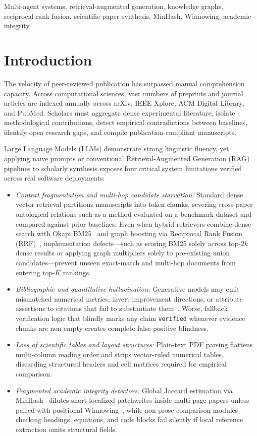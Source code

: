 \documentclass[conference]{IEEEtran}
\begin{document}
\begin{IEEEkeywords}
Multi-agent systems, retrieval-augmented generation, knowledge graphs, reciprocal rank fusion, scientific paper synthesis, MinHash, Winnowing, academic integrity.
\end{IEEEkeywords}

\section{Introduction}
The velocity of peer-reviewed publication has surpassed manual comprehension capacity. Across computational sciences, vast numbers of preprints and journal articles are indexed annually across arXiv, IEEE Xplore, ACM Digital Library, and PubMed. Scholars must aggregate dense experimental literature, isolate methodological contributions, detect empirical contradictions between baselines, identify open research gaps, and compile publication-compliant manuscripts.

Large Language Models (LLMs) demonstrate strong linguistic fluency, yet applying naive prompts or conventional Retrieval-Augmented Generation (RAG)~\cite{lewis2020rag} pipelines to scholarly synthesis exposes four critical system limitations verified across real software deployments:
\begin{itemize}
  \item \emph{Context fragmentation and multi-hop candidate starvation:} Standard dense vector retrieval partitions manuscripts into token chunks, severing cross-paper ontological relations such as a method evaluated on a benchmark dataset and compared against prior baselines. Even when hybrid retrievers combine dense search with Okapi BM25~\cite{robertson2009bm25} and graph boosting via Reciprocal Rank Fusion (RRF)~\cite{cormack2009rrf}, implementation defects---such as scoring BM25 solely across top-$2k$ dense results or applying graph multipliers solely to pre-existing union candidates---prevent unseen exact-match and multi-hop documents from entering top-$K$ rankings.
  \item \emph{Bibliographic and quantitative hallucination:} Generative models may emit mismatched numerical metrics, invert improvement directions, or attribute assertions to citations that fail to substantiate them~\cite{min2023factscore}. Worse, fallback verification logic that blindly marks any claim \texttt{verified} whenever evidence chunks are non-empty creates complete false-positive blindness.
  \item \emph{Loss of scientific tables and layout structures:} Plain-text PDF parsing flattens multi-column reading order and strips vector-ruled numerical tables, discarding structured headers and cell matrices required for empirical comparison.
  \item \emph{Fragmented academic integrity detectors:} Global Jaccard estimation via MinHash~\cite{broder1997minhash} dilutes short localized patchwrites inside multi-page papers unless paired with positional Winnowing~\cite{schleimer2003winnowing}, while non-prose comparison modules checking headings, equations, and code blocks fail silently if local reference extraction omits structural fields.
\end{itemize}
\end{document}
